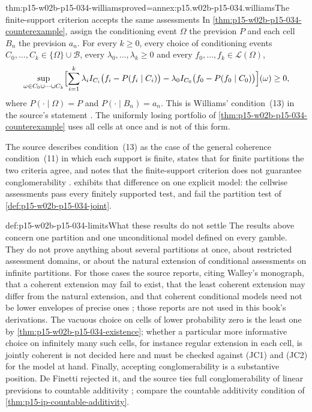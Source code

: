 \begin{hbtheorem}{thm:p15-w02b-p15-034-williams}{proved=annex:p15.w02b-p15-034.williams}{The finite-support criterion accepts the same assessments}
In \cref{thm:p15-w02b-p15-034-counterexample}, assign the conditioning
event \(\Omega\) the prevision \(P\) and each cell \(B_n\) the prevision
\(a_n\). For every \(k\geq0\), every choice of conditioning events
\(C_0,\ldots,C_k\in\{\Omega\}\cup\mathcal B\), every
\(\lambda_0,\ldots,\lambda_k\geq0\) and every
\(f_0,\ldots,f_k\in\mathcal L(\Omega)\),
\[
 \sup_{\omega\in C_0\cup\cdots\cup C_k}
 \Bigl[\sum_{i=1}^k\lambda_iI_{C_i}\bigl(f_i-P(f_i\mid C_i)\bigr)
       -\lambda_0I_{C_0}\bigl(f_0-P(f_0\mid C_0)\bigr)\Bigr](\omega)\geq0,
\]
where \(P(\cdot\mid\Omega)=P\) and \(P(\cdot\mid B_n)=a_n\). This is
Williams' condition~(13) in the source's statement
\cite[§5.2, p.~32]{MirandaCoherentLowerPrevisionsCapture}.
The uniformly losing portfolio of
\cref{thm:p15-w02b-p15-034-counterexample} uses all cells at once and is
not of this form.
\end{hbtheorem}

The source describes condition~(13) as the case of the general coherence
condition~(11) in which each support is finite, states that for finite
partitions the two criteria agree, and notes that the finite-support
criterion does not guarantee conglomerability
\cite[§5.2, p.~32]{MirandaCoherentLowerPrevisionsCapture}.
 exhibits that difference on one
explicit model: the cellwise assessments pass every finitely supported test,
and fail the partition test of \cref{def:p15-w02b-p15-034-joint}.

\begin{hbwarning}{def:p15-w02b-p15-034-limits}{What these results do not settle}
The results above concern one partition and one unconditional model
defined on every gamble. They do not prove anything about several
partitions at once, about restricted assessment domains, or about the
natural extension of conditional assessments on infinite partitions. For
those cases the source reports, citing Walley's monograph, that a coherent
extension may fail to exist, that the least coherent extension may differ
from the natural extension, and that coherent conditional models need not
be lower envelopes of precise ones
\cite[§3.2.1, pp.~20--21]{MirandaCoherentLowerPrevisionsCapture}; those
reports are not used in this book's derivations. The vacuous choice on cells
of lower probability zero is the least one by
\cref{thm:p15-w02b-p15-034-existence}; whether a particular more
informative choice on infinitely many such cells, for instance regular
extension in each cell, is jointly coherent is not decided here and must
be checked against (JC1) and (JC2) for the model at hand.
Finally, accepting conglomerability is a substantive position. De Finetti
rejected it, and the source ties full conglomerability of linear
previsions to countable additivity
\cite[pp.~24 and~31]{MirandaCoherentLowerPrevisionsCapture}; compare the
countable additivity condition of \cref{thm:p15-ip-countable-additivity}.
\end{hbwarning}

